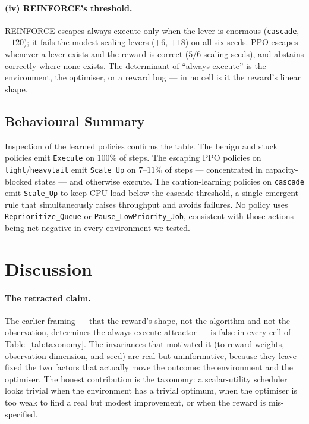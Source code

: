 \documentclass[10pt,twocolumn]{article}
\newcommand{\term}[1]{\texttt{#1}}
\newcommand{\env}[1]{\texttt{#1}}
\begin{document}
\paragraph{(iv) REINFORCE's threshold.} REINFORCE escapes always-execute only when
the lever is enormous (\env{cascade}, $+120$); it fails the modest scaling levers
($+6$, $+18$) on all six seeds. PPO escapes whenever a lever exists and the reward
is correct ($5/6$ scaling seeds), and abstains correctly where none exists. The
determinant of ``always-execute'' is the environment, the optimiser, or a reward
bug --- in no cell is it the reward's linear shape.

\subsection{Behavioural Summary}
\label{sec:behaviour}

Inspection of the learned policies confirms the table. The benign and stuck
policies emit \term{Execute} on $100\%$ of steps. The escaping PPO policies on
\env{tight}/\env{heavytail} emit \term{Scale\_Up} on $7$--$11\%$ of steps ---
concentrated in capacity-blocked states --- and otherwise execute. The
caution-learning policies on \env{cascade} emit \term{Scale\_Up} to keep CPU load
below the cascade threshold, a single emergent rule that simultaneously raises
throughput and avoids failures. No policy uses \term{Reprioritize\_Queue} or
\term{Pause\_LowPriority\_Job}, consistent with those actions being net-negative
in every environment we tested.

\section{Discussion}
\label{sec:discussion}

\paragraph{The retracted claim.} The earlier framing --- that the reward's shape,
not the algorithm and not the observation, determines the always-execute
attractor --- is false in every cell of Table~\ref{tab:taxonomy}. The invariances
that motivated it (to reward weights, observation dimension, and seed) are real
but uninformative, because they leave fixed the two factors that actually move the
outcome: the environment and the optimiser. The honest contribution is the
taxonomy: a scalar-utility scheduler looks trivial when the environment has a
trivial optimum, when the optimiser is too weak to find a real but modest
improvement, or when the reward is mis-specified.
\end{document}
